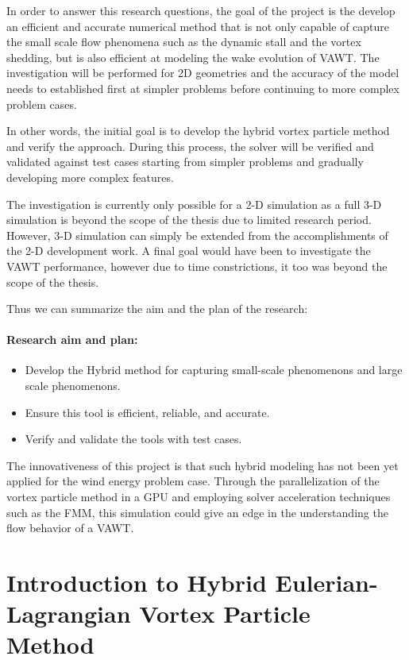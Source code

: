 In order to answer this research questions, the goal of the project is the develop an efficient and accurate
numerical method that is not only capable of capture the small scale flow phenomena such as the dynamic stall and the vortex shedding, but is also efficient at modeling the wake evolution of VAWT. The investigation will be performed for 2D geometries and the accuracy of the model needs to established first at simpler problems before continuing to more complex problem cases.

In other words, the initial goal is to develop the hybrid vortex particle method and verify the approach. During this process, the solver will be verified and validated against test cases starting from simpler problems and gradually developing more complex features.

The investigation is currently only possible for a 2-D simulation as a full 3-D simulation is beyond the scope of the thesis due to limited research period. However, 3-D simulation can simply be extended from the accomplishments of the 2-D development work. A final goal would have been to investigate the VAWT performance, however due to time constrictions, it too was beyond the scope of the thesis.

Thus we can summarize the aim and the plan of the research:

\paragraph*{Research aim and plan:}

	\begin{itemize}
	\item Develop the Hybrid method for capturing small-scale phenomenons and large scale phenomenons.
	\item Ensure this tool is efficient, reliable, and accurate.
	\item Verify and validate the tools with test cases.
	\end{itemize}

The innovativeness of this project is that such hybrid modeling has not been yet applied for the wind energy problem case. Through the parallelization of the vortex particle method in a GPU and employing solver acceleration techniques such as the FMM, this simulation could give an edge in the understanding the flow behavior of a VAWT.

\section{Introduction to Hybrid Eulerian-Lagrangian Vortex Particle Method}

